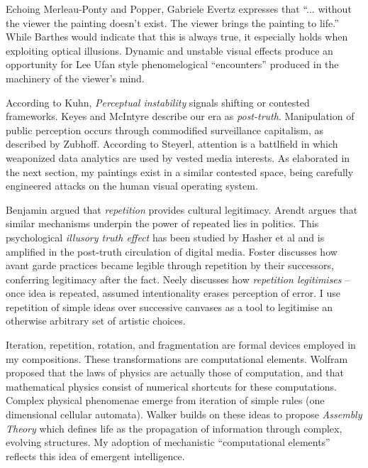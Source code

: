 \documentclass[12pt]{article}
\begin{document}
Echoing Merleau-Ponty\cite{merleauPonty1962phenomenology} and
Popper\cite{popper1972objective}, Gabriele Evertz expresses that
``... without the viewer the painting doesn't exist. The viewer brings
the painting to life.''\cite{evertz09documentary} While Barthes
would indicate that this is always true,\cite{barthes1977death} it
especially holds when exploiting optical illusions. Dynamic and
unstable visual effects produce an opportunity for Lee Ufan style
phenomelogical ``encounters''\cite[p. 52-6]{encounter} produced in
the machinery of the viewer's mind.

According to Kuhn, \emph{Perceptual instability} signals shifting or
contested frameworks.\cite[p. 64]{kuhn1970structure}
Keyes\cite{keyes2004posttruth} and
McIntyre\cite{mcintyre2018posttruth} describe our era as
\emph{post-truth}.  Manipulation of public perception occurs through
commodified surveillance capitalism, as described by
Zubhoff\cite[p. 8-12]{zuboff2019surveillance}. According to
Steyerl\cite{steyerl2016sea}, attention is a battlfield in which
weaponized data analytics are used by vested media interests. As
elaborated in the next section, my paintings exist in a similar
contested space, being carefully engineered attacks on the human visual
operating system.

Benjamin argued that \emph{repetition} provides cultural
legitimacy.\cite{benjamin1935kunstwerk} Arendt argues that similar
mechanisms underpin the power of repeated lies in
politics.\cite{arendt1972lying} This psychological \emph{illusory
  truth effect} has been studied by Hasher et
al\cite{hasher1977frequency} and is amplified in the
post-truth\cite{keyes2004posttruth,mcintyre2018posttruth} circulation
of digital
media\cite{zuboff2019surveillance}. Foster\cite[p. 29-30]{foster1996return}
discusses how avant garde practices became legible through repetition
by their successors, conferring legitimacy after the fact. Neely
discusses how \emph{repetition legitimises} -- once idea is repeated,
assumed intentionality erases perception of
error.\cite{neely-repetition} I use repetition of simple ideas over
successive canvases as a tool to legitimise an otherwise arbitrary set
of artistic choices.

Iteration, repetition, rotation, and fragmentation are formal devices
employed in my compositions. These transformations are computational
elements. Wolfram proposed that the laws of physics
are actually those of computation, and that mathematical physics
consist of numerical shortcuts for these computations.\cite{wolfram1984} Complex
physical phenomenae emerge from iteration of simple rules
(one dimensional cellular automata)\cite{wolfram}. 
Walker builds on these ideas to propose
\emph{Assembly Theory} which defines life as the propagation of
information through complex, evolving structures.\cite{walker2024life} My adoption of
mechanistic ``computational elements'' reflects this idea of
emergent intelligence.
\end{document}
